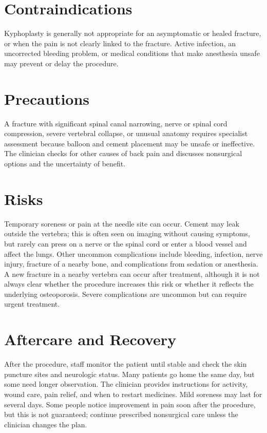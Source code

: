 \section*{Contraindications}
Kyphoplasty is generally not appropriate for an asymptomatic or healed fracture, or when the pain is not clearly linked to the fracture. Active infection, an uncorrected bleeding problem, or medical conditions that make anesthesia unsafe may prevent or delay the procedure.

\section*{Precautions}
A fracture with significant spinal canal narrowing, nerve or spinal cord compression, severe vertebral collapse, or unusual anatomy requires specialist assessment because balloon and cement placement may be unsafe or ineffective. The clinician checks for other causes of back pain and discusses nonsurgical options and the uncertainty of benefit.

\section*{Risks}
Temporary soreness or pain at the needle site can occur. Cement may leak outside the vertebra; this is often seen on imaging without causing symptoms, but rarely can press on a nerve or the spinal cord or enter a blood vessel and affect the lungs. Other uncommon complications include bleeding, infection, nerve injury, fracture of a nearby bone, and complications from sedation or anesthesia. A new fracture in a nearby vertebra can occur after treatment, although it is not always clear whether the procedure increases this risk or whether it reflects the underlying osteoporosis. Severe complications are uncommon but can require urgent treatment.

\section*{Aftercare and Recovery}
After the procedure, staff monitor the patient until stable and check the skin puncture sites and neurologic status. Many patients go home the same day, but some need longer observation. The clinician provides instructions for activity, wound care, pain relief, and when to restart medicines. Mild soreness may last for several days. Some people notice improvement in pain soon after the procedure, but this is not guaranteed; continue prescribed nonsurgical care unless the clinician changes the plan.


